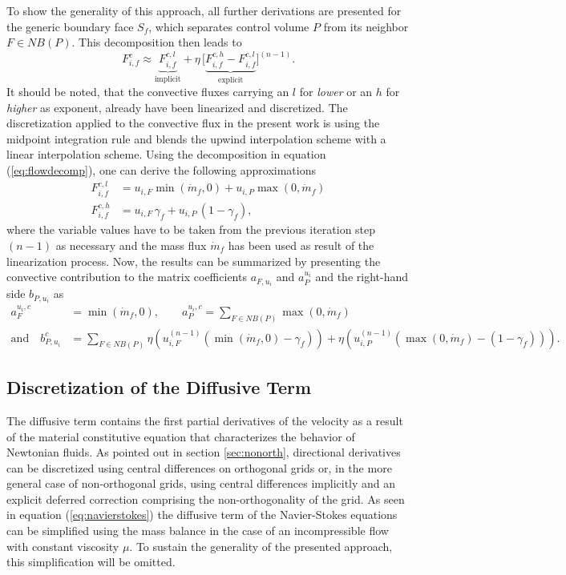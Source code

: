 To show the generality of this approach, all further derivations are presented for the generic boundary face \(S_f\), which separates control volume \(P\) from its neighbor \(F \in NB(P)\). This decomposition then leads to
\begin{equation}
  \label{eq:flowdecomp}
  F_{i,f}^c \approx  \underbrace{F_{i,f}^{c,l}}_{\text{implicit}} + \eta \, \bigl[\underbrace{ F_{i,f}^{c,h} - F_{i,f}^{c,l} }_{\text{explicit}}\bigr]^{(n-1)}.
\end{equation}
It should be noted, that the convective fluxes carrying an \(l\) for \emph{lower} or an \(h\) for \emph{higher} as exponent, already have been linearized and discretized. The discretization applied to the convective flux in the present work is using the midpoint integration rule and blends the upwind interpolation scheme with a linear interpolation scheme. Using the decomposition in equation (\ref{eq:flowdecomp}), one can derive the following approximations
\begin{align*}
  F_{i,f}^{c,l} &= u_{i,F} \min(\dot{m}_f ,0) + u_{i,P} \max(0,\dot{m}_f) \\
  F_{i,f}^{c,h} &= u_{i,F} \, \gamma_f + u_{i,P} \, (1 - \gamma_f),
\end{align*}
where the variable values have to be taken from the previous iteration step \((n-1)\) as necessary and the mass flux \(\dot{m}_f\) has been used as result of the linearization process. Now, the results can be summarized by presenting the convective contribution to the matrix coefficients \(a_{F,u_i}\) and \(a_P^{u_i}\) and the right-hand side \(b_{P,u_i}\) as
\begin{align*}
  a_F^{u_i,c} &= \min(\dot{m}_f ,0), \quad \quad a_P^{u_i,c} = \sum_{F \in NB(P)} \max(0,\dot{m}_f) \\[1em]
  \text{and} \quad b_{P,u_i}^c &= \sum_{F \in NB(P)} \eta  \left(u_{i,F}^{(n-1)} \left( \min(\dot{m}_f,0) - \gamma_f \right)\right)
                   + \eta \left( u_{i,P}^{(n-1)} \left( \max(0,\dot{m}_f) - \left(1 - \gamma_f\right) \right)\right).
\end{align*}

\subsection{Discretization of the Diffusive Term}

The diffusive term contains the first partial derivatives of the velocity as a result of the material constitutive equation that characterizes the behavior of Newtonian fluids. As pointed out in section \ref{sec:nonorth}, directional derivatives can be discretized using central differences on orthogonal grids or, in the more general case of non-orthogonal grids, using central differences implicitly and an explicit deferred correction comprising the non-orthogonality of the grid. As seen in equation (\ref{eq:navierstokes}) the diffusive term of the Navier-Stokes equations can be simplified using the mass balance in the case of an incompressible flow with constant viscosity \(\mu\). To sustain the generality of the presented approach, this simplification will be omitted.

